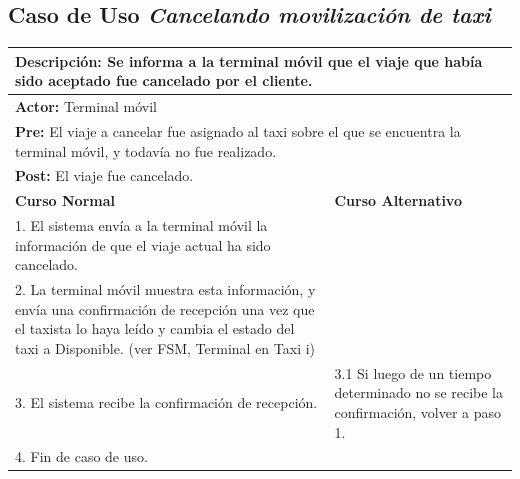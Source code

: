 \documentclass[a4paper]{article}
\begin{document}
\subsection{Caso de Uso \textit{Cancelando movilizaci\'on de taxi}}
\begin{center}
\begin{tabular}{|p{10cm} | p{6cm}|}
\hline
\multicolumn{2}{|p{16cm}|}{\textbf{Descripci\'on:} Se informa a la terminal m\'ovil que el viaje que hab\'ia sido aceptado fue cancelado por el cliente.} \\
\hline
\multicolumn{2}{|p{15cm}|}{\textbf{Actor:} Terminal m\'ovil} \\
\hline
\multicolumn{2}{|p{15cm}|}{\textbf{Pre:} El viaje a cancelar fue asignado al taxi sobre el que se encuentra la terminal m\'ovil, y todav\'ia no fue realizado.} \\
\hline
\multicolumn{2}{|p{15cm}|}{\textbf{Post:} El viaje fue cancelado.}\\
\hline
\textbf{Curso Normal}  & \textbf{Curso Alternativo} \\ \hline
1. El sistema env\'ia a la terminal m\'ovil la informaci\'on de que el viaje actual ha sido cancelado. & \\ \hline
2. La terminal m\'ovil muestra esta informaci\'on, y env\'ia una confirmaci\'on de recepci\'on una vez que el taxista lo haya le\'ido y cambia el estado del taxi a Disponible. (ver FSM, Terminal en Taxi i) & \\ \hline
3. El sistema recibe la confirmaci\'on de recepci\'on. & 3.1 Si luego de un tiempo determinado no se recibe la confirmaci\'on, volver a paso 1. \\  \hline
4. Fin de caso de uso. & \\ \hline
\end{tabular}
\end{center}
\end{document}
